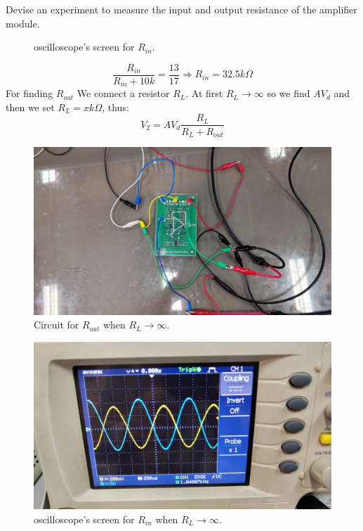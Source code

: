 \documentclass[11pt]{article}
\newcommand{\PicScale}{0.2}
\begin{document}
\begin{question}
\begin{subquestion}{Devise an experiment to measure the input and output resistance of the amplifier module.}
{\begin{figure}[H]
                \caption{oscilloscope's screen for $R_{in}$.}
            \end{figure}
            \[
                \frac{R_{in}}{R_{in} + 10k} = \frac{13}{17} \Rightarrow R_{in} = 32.5k\Omega
            \]
            For finding $R_{out}$ We connect a resistor $R_L$. At first $R_L \to \infty$ so we find $AV_d$ and then we set $R_L = xk\Omega$, thus:
            \[
                V_2 = AV_d \frac{R_L}{R_L + R_{out}}
            \]
            \begin{figure}[H]
                \centering
                \includegraphics[scale=\PicScale,angle=0]{Fig/40.jpeg}
                \caption{Circuit for $R_{out}$ when $R_L \to \infty$.}
            \end{figure}
            \begin{figure}[H]
                \centering
                \includegraphics[scale=\PicScale,angle=0]{Fig/41.jpeg}
                \caption{oscilloscope's screen for $R_{in}$ when $R_L \to \infty$.}
            \end{figure}
            \begin{figure}[H]

\end{figure}}
\end{subquestion}
\end{question}
\end{document}
